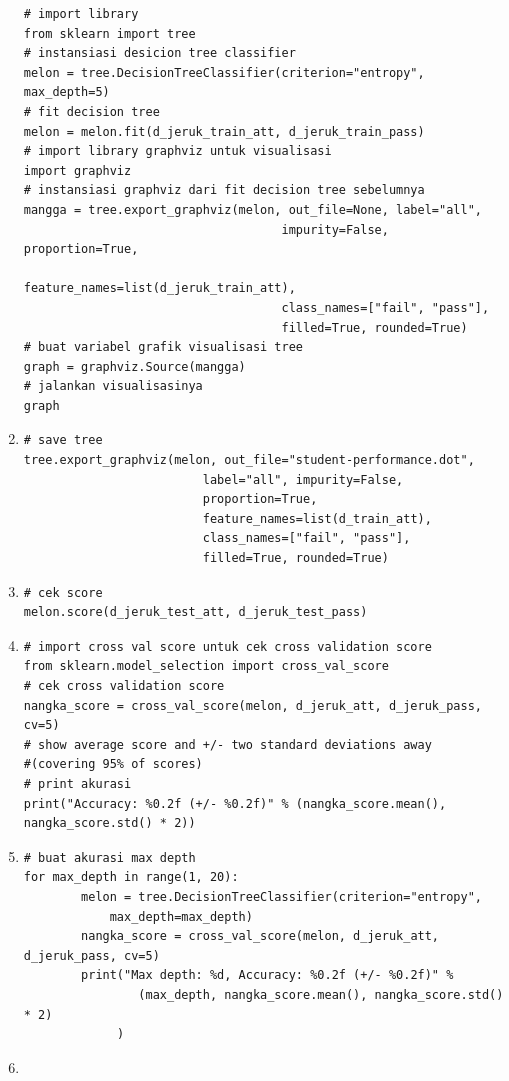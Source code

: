 \begin{enumerate}
\begin{lstlisting}
# import library
from sklearn import tree
# instansiasi desicion tree classifier
melon = tree.DecisionTreeClassifier(criterion="entropy", max_depth=5)
# fit decision tree
melon = melon.fit(d_jeruk_train_att, d_jeruk_train_pass)
# import library graphviz untuk visualisasi
import graphviz
# instansiasi graphviz dari fit decision tree sebelumnya
mangga = tree.export_graphviz(melon, out_file=None, label="all", 
									impurity=False, proportion=True,
	                                feature_names=list(d_jeruk_train_att), 
									class_names=["fail", "pass"], 
	                                filled=True, rounded=True)
# buat variabel grafik visualisasi tree
graph = graphviz.Source(mangga)
# jalankan visualisasinya
graph
\end{lstlisting}
\item
\begin{lstlisting}
# save tree
tree.export_graphviz(melon, out_file="student-performance.dot", 
						 label="all", impurity=False, 
						 proportion=True,
	                     feature_names=list(d_train_att), 
	                     class_names=["fail", "pass"], 
	                     filled=True, rounded=True)
\end{lstlisting}
\item
\begin{lstlisting}
# cek score
melon.score(d_jeruk_test_att, d_jeruk_test_pass)
\end{lstlisting}
\item
\begin{lstlisting}
# import cross val score untuk cek cross validation score
from sklearn.model_selection import cross_val_score
# cek cross validation score
nangka_score = cross_val_score(melon, d_jeruk_att, d_jeruk_pass, cv=5)
# show average score and +/- two standard deviations away 
#(covering 95% of scores)
# print akurasi
print("Accuracy: %0.2f (+/- %0.2f)" % (nangka_score.mean(), nangka_score.std() * 2))
\end{lstlisting}
\item 
\begin{lstlisting}
# buat akurasi max depth
for max_depth in range(1, 20):
	    melon = tree.DecisionTreeClassifier(criterion="entropy", 
			max_depth=max_depth)
	    nangka_score = cross_val_score(melon, d_jeruk_att, d_jeruk_pass, cv=5)
	    print("Max depth: %d, Accuracy: %0.2f (+/- %0.2f)" % 
				(max_depth, nangka_score.mean(), nangka_score.std() * 2)
			 )
\end{lstlisting}
\item
\begin{lstlisting}

\end{lstlisting}
\end{enumerate}
